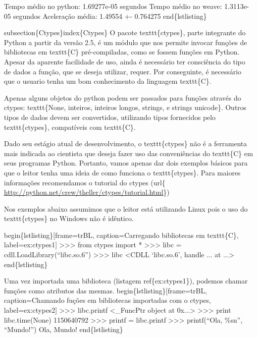 \documentclass[a4paper,10pt,portuguese]{sphinxmanual}
\begin{document}
Tempo médio no python: 1.69277e-05 segundos
Tempo médio no weave: 1.3113e-05 segundos
Aceleração média: 1.49554 +- 0.764275
end\{lstlisting\}

subsection\{Ctypes\}index\{Ctypes\}
O pacote texttt\{ctypes\}, parte integrante do Python a partir da versão 2.5, é um módulo que nos permite invocar funções de bibliotecas em texttt\{C\} pré-compiladas, como se fossem funções em Python.  Apesar da aparente facilidade de uso, ainda é necessário ter consciência do tipo de dados a função, que se deseja utilizar, requer. Por conseguinte, é necessário que o usuario tenha um bom conhecimento da linguagem texttt\{C\}.

Apenas alguns objetos do python podem ser passados para funções através do ctypes: texttt\{None, inteiros, inteiros longos, strings, e strings unicode\}. Outros tipos de dados devem ser convertidos, utilizando tipos fornecidos pelo texttt\{ctypes\}, compatíveis com texttt\{C\}.

Dado seu estágio atual de desenvolvimento, o texttt\{ctypes\} não é a ferramenta mais indicada ao cientista que deseja fazer uso das conveniências do texttt\{C\} em seus programas Python. Portanto, vamos apenas dar dois exemplos básicos para que o leitor tenha uma ideia de como funciona o texttt\{ctypes\}. Para maiores informações recomendamos o tutorial do ctypes (url\{ \href{http://python.net/crew/theller/ctypes/tutorial.html}{http://python.net/crew/theller/ctypes/tutorial.html}\})

Nos exemplos abaixo assumimos que o leitor está utilizando Linux pois o uso do texttt\{ctypes\} no Windows não é idêntico.

begin\{lstlisting\}{[}frame=trBL, caption=Carregando bibliotecas em texttt\{C\}, label=ex:ctypes1{]}
\textgreater{}\textgreater{}\textgreater{} from ctypes import *
\textgreater{}\textgreater{}\textgreater{} libc = cdll.LoadLibrary(``libc.so.6'')
\textgreater{}\textgreater{}\textgreater{} libc
\textless{}CDLL `libc.so.6', handle ... at ...\textgreater{}
end\{lstlisting\}

Uma vez importada uma biblioteca (listagem ref\{ex:ctypes1\}), podemos chamar funções como atributos das mesmas.
begin\{lstlisting\}{[}frame=trBL, caption=Chamando fuções em bibliotecas importadas com o ctypes, label=ex:ctypes2{]}
\textgreater{}\textgreater{}\textgreater{} libc.printf
\textless{}\_FuncPtr object at 0x...\textgreater{}
\textgreater{}\textgreater{}\textgreater{} print libc.time(None)
1150640792
\textgreater{}\textgreater{}\textgreater{} printf = libc.printf
\textgreater{}\textgreater{}\textgreater{} printf(``Ola, \%sn'', ``Mundo!'')
Ola, Mundo!
end\{lstlisting\}
\end{document}
